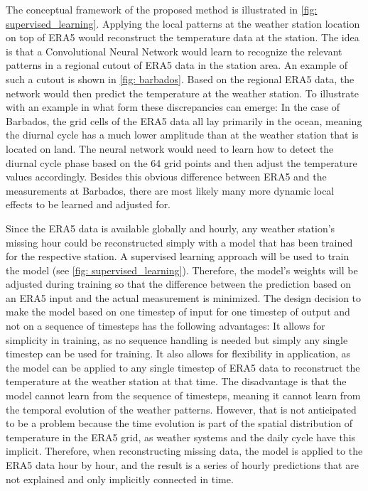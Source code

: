 The conceptual framework of the proposed method is illustrated in \autoref{fig: supervised_learning}.
Applying the local patterns at the weather station location on top of ERA5 would reconstruct the temperature data at the station.
The idea is that a Convolutional Neural Network would learn to recognize the relevant patterns in a regional cutout of ERA5 data in the station area.
An example of such a cutout is shown in \autoref{fig: barbados}.
Based on the regional ERA5 data, the network would then predict the temperature at the weather station.
To illustrate with an example in what form these discrepancies can emerge:
In the case of Barbados, the grid cells of the ERA5 data all lay primarily in the ocean, meaning the diurnal cycle has a much lower amplitude than at the weather station that is located on land.
The neural network would need to learn how to detect the diurnal cycle phase based on the 64 grid points and then adjust the temperature values accordingly.
Besides this obvious difference between ERA5 and the measurements at Barbados, there are most likely many more dynamic local effects to be learned and adjusted for.

Since the ERA5 data is available globally and hourly, any weather station's missing hour could be reconstructed simply with a model that has been trained for the respective station.
A supervised learning approach will be used to train the model (see \autoref{fig: supervised_learning}).
Therefore, the model's weights will be adjusted during training so that the difference between the prediction based on an ERA5 input and the actual measurement is minimized.
The design decision to make the model based on one timestep of input for one timestep of output and not on a sequence of timesteps has the following advantages: It allows for simplicity in training, as no sequence handling is needed but simply any single timestep can be used for training.
It also allows for flexibility in application, as the model can be applied to any single timestep of ERA5 data to reconstruct the temperature at the weather station at that time.
The disadvantage is that the model cannot learn from the sequence of timesteps, meaning it cannot learn from the temporal evolution of the weather patterns.
However, that is not anticipated to be a problem because the time evolution is part of the spatial distribution of temperature in the ERA5 grid, as weather systems and the daily cycle have this implicit.
Therefore, when reconstructing missing data, the model is applied to the ERA5 data hour by hour, and the result is a series of hourly predictions that are not explained and only implicitly connected in time.

